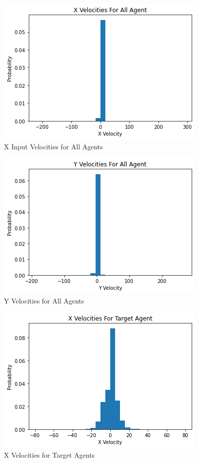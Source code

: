 \documentclass{article}
\begin{document}
\begin{figure}[H]
    \centering
    \includegraphics[scale=.5]{v_all_x.png}
    \caption{X Input Velocities for All Agents}
    \label{fig:galaxy}
\end{figure}
\begin{figure}[H]
    \centering
    \includegraphics[scale=.5]{v_all_y.png}
    \caption{Y Velocities for All Agents}
    \label{fig:galaxy}
\end{figure}
\begin{figure}[H]
    \centering
    \includegraphics[scale=.5]{v_target_x.png}
    \caption{X Velocities for Target Agents}
    \label{fig:galaxy}
\end{figure}
\end{document}
